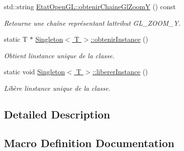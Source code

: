 \begin{DoxyCompactItemize}
std\+::string \hyperlink{group__utilitaire_ga4231723bc8a26f191c53329dceed9222}{Etat\+Open\+G\+L\+::obtenir\+Chaine\+Gl\+Zoom\+Y} () const 
\begin{DoxyCompactList}\small\item\em Retourne une chaîne représentant l\textquotesingle{}attribut G\+L\+\_\+\+Z\+O\+O\+M\+\_\+\+Y. \end{DoxyCompactList}\item 
static T $\ast$ \hyperlink{group__utilitaire_ga349c289d77c484b8b4a180843d968b46}{Singleton$<$ T $>$\+::obtenir\+Instance} ()
\begin{DoxyCompactList}\small\item\em Obtient l\textquotesingle{}instance unique de la classe. \end{DoxyCompactList}\item 
static void \hyperlink{group__utilitaire_ga2b9ae943a004663d769be3f08ae35a0f}{Singleton$<$ T $>$\+::liberer\+Instance} ()
\begin{DoxyCompactList}\small\item\em Libère l\textquotesingle{}instance unique de la classe. \end{DoxyCompactList}\end{DoxyCompactItemize}


\subsection{Detailed Description}


\subsection{Macro Definition Documentation}
\hypertarget{group__utilitaire_ga1e4ee9d5709f277c392eea80755d85d0}{}
